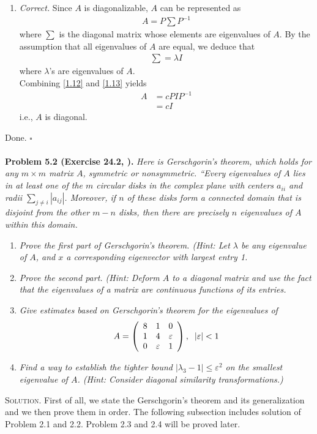 \documentclass[a4paper,oneside]{book}
\numberwithin{equation}{chapter}
\begin{document}
\begin{enumerate}
\item \textit{Correct.} Since $A$ is diagonalizable, $A$ can be represented as
\begin{align}
\label{1.12}
A = P\sum {P^{ - 1}}
\end{align}
where $\sum$ is the diagonal matrix whose elements are eigenvalues of $A$. By the assumption that all eigenvalues of $A$ are equal, we deduce that
\begin{align}
\label{1.13}
\sum  = \lambda I
\end{align}
where $\lambda$'s are eigenvalues of $A$.\\
Combining \eqref{1.12} and \eqref{1.13} yields
\begin{align}
A &= cPI{P^{ - 1}}\\
 &= cI
\end{align}
i.e., $A$ is diagonal. 
\end{enumerate}
Done. \hfill $\square$\\
\\
\textbf{Problem 5.2 (Exercise 24.2, \cite{1}).} \textit{Here is Gerschgorin's theorem, which holds for any $m\times m$ matrix $A$, symmetric or nonsymmetric. ``Every eigenvalues of $A$ lies in at least one of the $m$ circular disks in the complex plane with centers $a_{ii}$ and radii $\sum\nolimits_{j \ne i} {\left| {{a_{ij}}} \right|} $. Moreover, if $n$ of these disks form a connected domain that is disjoint from the other $m-n$ disks, then there are precisely $n$ eigenvalues of $A$ within this domain.}
\begin{enumerate}
\item \textit{Prove the first part of Gerschgorin's theorem. (Hint: Let $\lambda$ be any eigenvalue of $A$, and $x$ a corresponding eigenvector with largest entry 1.}
\item \textit{Prove the second part. (Hint: Deform $A$ to a diagonal matrix and use the fact that the eigenvalues of a matrix are continuous functions of its entries.}
\item \textit{Give estimates based on Gerschgorin's theorem for the eigenvalues of}
\begin{align}
\label{1.16}
A = \left( {\begin{array}{*{20}{c}}
8&1&0\\
1&4&\varepsilon \\
0&\varepsilon &1
\end{array}} \right),\hspace{0.2cm} \left| \varepsilon  \right| < 1
\end{align}
\item \textit{Find a way to establish the tighter bound $\left| {{\lambda _3} - 1} \right| \le {\varepsilon ^2}$ on the smallest eigenvalue of $A$. (Hint: Consider diagonal similarity transformations.)}
\end{enumerate}
\textsc{Solution.} First of all, we state the Gerschgorin's theorem and its generalization and we then prove them in order. The following subsection includes solution of Problem 2.1 and 2.2. Problem 2.3 and 2.4 will be proved later.
\end{document}
